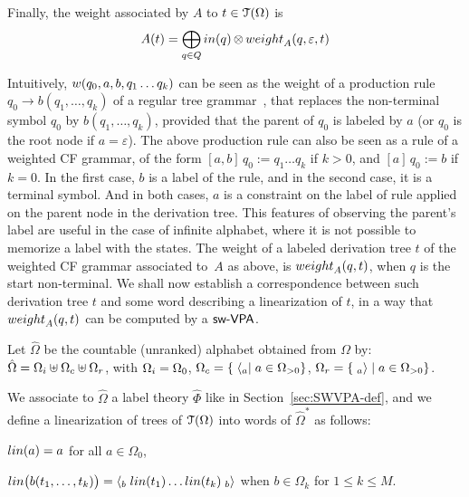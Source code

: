 \medskip\noindent
Finally, the weight associated by $A$ to  $t \in \mathcal{T}(\Omega)$ is 
\begin{equation}
A(t)  = 
\displaystyle\bigoplus_{q \in Q} \mathsf{in}(q) \mathop{\otimes} \weight_A(q, \varepsilon, t)
\label{eq:weightTA}
\end{equation}

\noindent
Intuitively, $\wei(q_0, a, b, q_1 \ldots q_k)$ can be seen as
the weight of a production rule $q_0 \to b(q_1, \ldots, q_k)$ 
of a regular tree grammar~\cite{tata}, 
that replaces the non-terminal symbol $q_0$ by $b(q_1, \ldots, q_k)$, 
provided that the parent of $q_0$ is labeled by $a$
(or $q_0$ is the root node if $a = \varepsilon$).
%
The above production rule can also be seen as 
a rule of a weighted CF grammar, of the form
$[a, b]\, q_0 := q_1 \ldots q_k$ if $k > 0$,
and $[a]\, q_0 := b$ if $k = 0$. 
In the first case, $b$ is a label of the rule, 
and in the second case, it is a terminal symbol.
And in both cases, $a$ is a constraint on the label of rule applied 
on the parent node in the derivation tree.
This features of observing the parent's label  
are useful in the case of infinite alphabet, 
where it is not possible to memorize a label with the states.
%
\noindent The weight of a labeled derivation tree $t$
of the weighted CF grammar associated to~$A$ as above, 
is $\weight_A(q, t)$, 
when $q$ is the start non-terminal.
%
We shall now establish a correspondence between such derivation tree $t$
and some word describing a linearization of $t$, 
in a way that $\weight_A(q, t)$ can be computed by a $\textsf{sw-VPA}$.

Let $\hat\Omega$ be the countable (unranked) alphabet obtained
from $\Omega$ by: 
$\hat\Omega = \Omegai \uplus \Omegac \uplus \Omegar$, with
$\Omegai = \Omega_0$, 
$\Omegac = \{ \; \call{a} \mid a \in \Omega_{>0} \}$,
$\Omegar = \{ \; \return{a} \mid a \in \Omega_{>0} \}$.

\noindent
We associate to $\hat\Omega$
a label theory $\hat{\Phi}$ 
like in Section~\ref{sec:SWVPA-def}, 
%
\noindent
and we define a linearization of trees of $\mathcal{T}(\Omega)$ into 
words of $\hat{\Omega}^*$ as follows:
\begin{description}
\item $\lin(a) = a$ for all $a \in \Omega_0$, 
\item $\lin\bigl( b(t_1, \ldots, t_k)\bigr) = 
       \call{b} \; \lin(t_1) \ldots \lin(t_k) \; \return{b}$ 
       when $b \in \Omega_k$ for $1 \leq k \leq M$.
\end{description}

